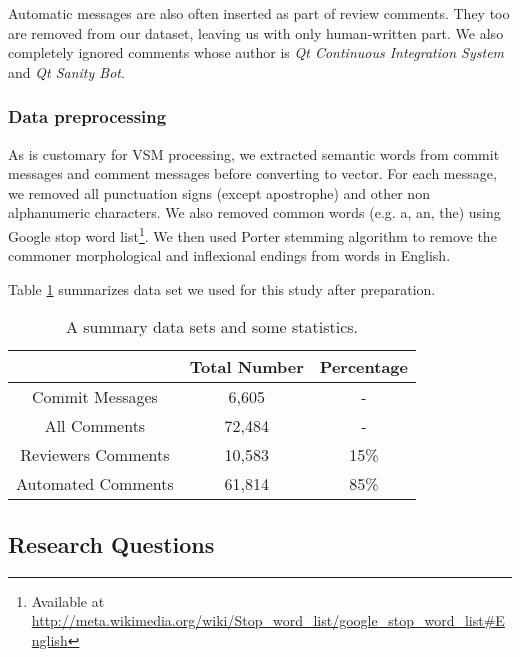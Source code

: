 Automatic messages are also often inserted as part of review comments.
They too are removed from our dataset, leaving us with only human-written part.
We also completely ignored comments whose author is \emph{Qt Continuous Integration System} and \emph{Qt Sanity Bot}.

\subsubsection{Data preprocessing}
As is customary for VSM processing, we extracted semantic words from commit messages and comment messages before converting to vector.
For each message, we removed all punctuation signs (except apostrophe) and other non alphanumeric characters. We also removed common words (e.g. a, an, the) using Google stop word list\footnote{Available at \url{http://meta.wikimedia.org/wiki/Stop_word_list/google_stop_word_list#English}}. We then used Porter stemming algorithm to remove the commoner morphological and inflexional endings from words in English.

Table \ref{tb:datastatistic} summarizes data set we used for this study after preparation. 

\begin{table}[!h]
\caption{A summary data sets and some statistics.}
\centering
\small
\begin{tabular}{ccc}
\hline
& Total Number & Percentage \\ \hline \hline
Commit Messages & 6,605 &  -  \\ \hline
All Comments & 72,484& - \\ \hline
Reviewers Comments & 10,583 & 15\% \\ \hline
Automated Comments & 61,814 & 85\% \\ \hline 

\end{tabular}
\label{tb:datastatistic}
\end{table}


\subsection{Research Questions}

